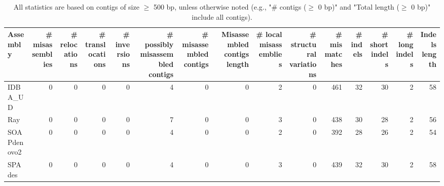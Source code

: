 \documentclass[12pt,a4paper]{article}
\begin{document}
\begin{table}[ht]
\begin{center}
\caption{All statistics are based on contigs of size $\geq$ 500 bp, unless otherwise noted (e.g., "\# contigs ($\geq$ 0 bp)" and "Total length ($\geq$ 0 bp)" include all contigs).}
\begin{tabular}{|l*{14}{|r}|}
\hline
Assembly & \# misassemblies &     \# relocations &     \# translocations &     \# inversions & \# possibly misassembled contigs & \# misassembled contigs & Misassembled contigs length & \# local misassemblies & \# structural variations & \# mismatches & \# indels &     \# short indels &     \# long indels & Indels length \\ \hline
IDBA\_UD & 0 & 0 & 0 & 0 & 4 & 0 & 0 & 2 & 0 & 461 & 32 & 30 & 2 & 58 \\ \hline
Ray & 0 & 0 & 0 & 0 & 7 & 0 & 0 & 3 & 0 & 438 & 30 & 28 & 2 & 56 \\ \hline
SOAPdenovo2 & 0 & 0 & 0 & 0 & 4 & 0 & 0 & 2 & 0 & 392 & 28 & 26 & 2 & 54 \\ \hline
SPAdes & 0 & 0 & 0 & 0 & 4 & 0 & 0 & 3 & 0 & 439 & 32 & 30 & 2 & 58 \\ \hline
\end{tabular}
\end{center}
\end{table}
\end{document}
